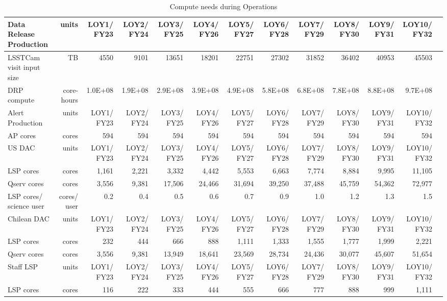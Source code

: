 \tiny \begin{longtable} { |p{}  |r  |r  |r  |r  |r  |r  |r  |r  |r  |r  |r  |r |} 
\caption{Compute needs during Operations \label{tab:computeSizingOps}}\\ 
\hline 
\textbf{Data Release Production}&\textbf{units}&\textbf{LOY1/ FY23}&\textbf{LOY2/ FY24}&\textbf{LOY3/ FY25}&\textbf{LOY4/ FY26}&\textbf{LOY5/ FY27}&\textbf{LOY6/ FY28}&\textbf{LOY7/ FY29}&\textbf{LOY8/ FY30}&\textbf{LOY9/ FY31}&\textbf{LOY10/ FY32} \\ \hline
{LSSTCam visit input size}&{TB}&{4550}&{9101}&{13651}&{18201}&{22751}&{27302}&{31852}&{36402}&{40953}&{45503} \\ \hline
{DRP compute}&{core-hours}&{1.0E+08}&{1.9E+08}&{2.9E+08}&{3.9E+08}&{4.9E+08}&{5.8E+08}&{6.8E+08}&{7.8E+08}&{8.8E+08}&{9.7E+08} \\ \hline
{Alert Production}&{units}&{LOY1/ FY23}&{LOY2/ FY24}&{LOY3/ FY25}&{LOY4/ FY26}&{LOY5/ FY27}&{LOY6/ FY28}&{LOY7/ FY29}&{LOY8/ FY30}&{LOY9/ FY31}&{LOY10/ FY32} \\ \hline
{AP cores}&{cores}&{594}&{594}&{594}&{594}&{594}&{594}&{594}&{594}&{594}&{594} \\ \hline
{US DAC}&{units}&{LOY1/ FY23}&{LOY2/ FY24}&{LOY3/ FY25}&{LOY4/ FY26}&{LOY5/ FY27}&{LOY6/ FY28}&{LOY7/ FY29}&{LOY8/ FY30}&{LOY9/ FY31}&{LOY10/ FY32} \\ \hline
{LSP cores}&{cores}&{1,161}&{2,221}&{3,332}&{4,442}&{5,553}&{6,663}&{7,774}&{8,884}&{9,995}&{11,105} \\ \hline
{Qserv cores}&{cores}&{3,556}&{9,381}&{17,506}&{24,466}&{31,694}&{39,250}&{37,488}&{45,759}&{54,362}&{72,977} \\ \hline
{LSP cores/ science user}&{cores/ user}&{0.2}&{0.4}&{0.5}&{0.6}&{0.7}&{0.9}&{1.0}&{1.2}&{1.3}&{1.5} \\ \hline
{Chilean DAC}&{units}&{LOY1/ FY23}&{LOY2/ FY24}&{LOY3/ FY25}&{LOY4/ FY26}&{LOY5/ FY27}&{LOY6/ FY28}&{LOY7/ FY29}&{LOY8/ FY30}&{LOY9/ FY31}&{LOY10/ FY32} \\ \hline
{LSP cores}&{cores}&{232}&{444}&{666}&{888}&{1,111}&{1,333}&{1,555}&{1,777}&{1,999}&{2,221} \\ \hline
{Qserv cores}&{cores}&{3,556}&{9,381}&{13,949}&{18,641}&{23,569}&{28,734}&{24,436}&{30,077}&{45,607}&{51,654} \\ \hline
{Staff LSP}&{units}&{LOY1/ FY23}&{LOY2/ FY24}&{LOY3/ FY25}&{LOY4/ FY26}&{LOY5/ FY27}&{LOY6/ FY28}&{LOY7/ FY29}&{LOY8/ FY30}&{LOY9/ FY31}&{LOY10/ FY32} \\ \hline
{LSP cores}&{cores}&{116}&{222}&{333}&{444}&{555}&{666}&{777}&{888}&{999}&{1,111} \\ \hline
\end{longtable} \normalsize
